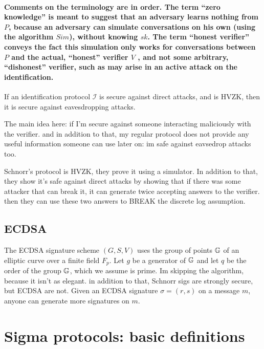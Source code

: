\paragraph{Comments on the terminology are in order. The term \textquotedblleft zero
knowledge\textquotedblright{} is meant to suggest that an adversary
learns nothing from $P$, because an adversary can simulate conversations
on his own (using the algorithm $Sim$), without knowing $sk$. The
term \textquotedblleft honest verifier\textquotedblright{} conveys
the fact this simulation only works for conversations between $P$
and the actual, \textquotedblleft honest\textquotedblright{} verifier
$V$ , and not some arbitrary, \textquotedblleft dishonest\textquotedblright{}
verifier, such as may arise in an \textbf{active attack} on the identification.}
\begin{theorem}
If an identification protocol $\mathcal{I}$ is secure against direct
attacks, and is HVZK, then it is secure against eavesdropping attacks. 
\end{theorem}
The main idea here: if I'm secure against someone interacting maliciously with the verifier.
and in addition to that, my regular protocol does not provide any useful information someone
can use later on: im safe against eavsedrop attacks too.

Schnorr's protocol is HVZK, they prove it using a simulator.
In addition to that, they show it's safe against direct attacks by showing that 
if there was some attacker that can break it, it can generate twice accepting answers
to the verifier.
then they can use these two answers to BREAK the discrete log assumption.


\subsection{ECDSA }

The ECDSA signature scheme $(G,S,V)$ uses the group of points $\mathbb{G}$
of an elliptic curve over a finite field $F_{p}$. Let $g$ be a generator
of $\mathbb{G}$ and let $q$ be the order of the group $\mathbb{G}$, which we assume
is prime. Im skipping the algorithm, because it isn't as elegant.
in addition to that, Schnorr sigs are strongly secure, but ECDSA are
not. Given an ECDSA signature $\sigma=\left(r,s\right)$ on a message
$m$, anyone can generate more signatures on $m$.


\section{Sigma protocols: basic definitions }

